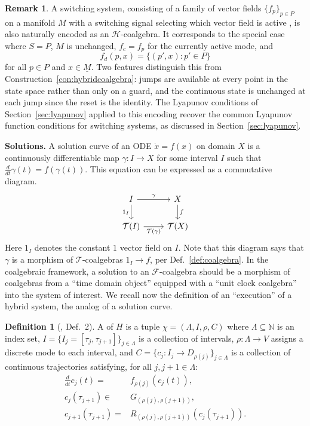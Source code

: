\documentclass[letterpaper, 10 pt, conference]{IEEEconf}
\newcommand{\subsect}[1]{\vspace{0.5em}\noindent\textbf{#1.}}
\theoremstyle{definition}
\newtheorem{defn}[thm]{Definition}
\newtheorem{rmk}[thm]{Remark}
\newcommand{\define}[1]{{\bf \boldmath{#1}}}
\newcommand{\maps}{\colon}
\newcommand{\N}{\mathbb N}
\newcommand{\functor}[1]{\mathcal{#1}}
\newcommand{\F}{\functor{F}}
\renewcommand{\H}{\functor{H}}
\newcommand{\T}{\functor{T}}
\begin{document}
\begin{rmk}
\label{rmk:switchingsystems}
    A switching system, consisting of a family of vector fields $\{f_p\}_{p \in P}$ on a manifold $M$ with a switching signal selecting which vector field is active \cite{liberzon2003switching}, is also naturally encoded as an $\H$-coalgebra. It corresponds to the special case where $S = P$, $M$ is unchanged, $f_c = f_p$ for the currently active mode, and
    \[
        f_d(p, x) = \{(p', x) : p' \in P\}
    \]
    for all $p \in P$ and $x \in \underline{M}$. Two features distinguish this from Construction~\ref{con:hybridcoalgebra}: jumps are available at every point in the state space rather than only on a guard, and the continuous state is unchanged at each jump since the reset is the identity. The Lyapunov conditions of Section~\ref{sec:lyapunov} applied to this encoding recover the common Lyapunov function conditions for switching systems, as discussed in Section~\ref{sec:lyapunov}.
\end{rmk}

\subsect{Solutions}
%
A solution curve of an ODE $\dot x=f(x)$ on domain $X$ is a continuously differentiable map $\gamma \maps I \to X$ for some interval $I$ such that $\frac{d}{dt}\gamma(t)=f(\gamma(t))$. This equation can be expressed as a commutative diagram.
\[
\begin{tikzcd}
    I
    \arrow[r, "\gamma"]
    \arrow[d, "1_I"']
    &
    X
    \arrow[d, "f"]
    \\
    \T(I)
    \arrow[r, "\T(\gamma)"']
    &
    \T(X)
\end{tikzcd}
\]
Here $1_I$ denotes the constant $1$ vector field on $I$. Note that this diagram says that $\gamma$ is a morphism of $\T$-coalgebras $1_I \to f$, per Def.~\ref{def:coalgebra}. In the coalgebraic framework, a solution to an $\F$-coalgebra should be a morphism of coalgebras from a ``time domain object'' equipped with a ``unit clock coalgebra'' into the system of interest. 
We recall now the definition of an ``execution'' of a hybrid system, the analog of a solution curve.

\begin{defn}[\cite{lamperski2012lyapunov}, Def.\ 2]
\label{def:execution}
    A \define{hybrid system execution} of $H$ is a tuple $\chi = (\Lambda, I, \rho, C)$ where $\Lambda \subseteq \N$ is an index set, $I = \{I_j = [\tau_j, \tau_{j+1}]\}_{j \in \Lambda}$ is a collection of intervals, $\rho \maps \Lambda \to V$ assigns a discrete mode to each interval, and $C = \{c_j \maps I_j \to D_{\rho(j)}\}_{j \in  \Lambda}$ is a collection of continuous trajectories satisfying, for all $j, j+1 \in \Lambda$:
    \begin{equation}
    \label{classical_condition}
    \begin{split}
    \frac{d}{dt} c_j(t) = & f_{\rho(j)}(c_j(t)), \\
     c_j(\tau_{j+1}) \in & G_{(\rho(j), \rho(j+1))}, \\
     c_{j+1}(\tau_{j+1}) = & R_{(\rho(j), \rho(j+1))}(c_j(\tau_{j+1})).
    \end{split}
    \end{equation}
\end{defn}
\end{document}
